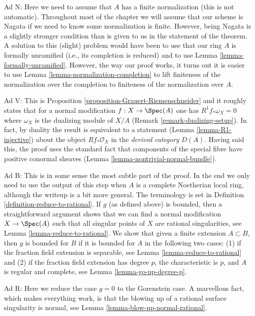 \medskip\noindent
Ad N: Here we need to assume that $A$ has a finite normalization
(this is not automatic). Throughout most of the chapter we will
assume that our scheme is Nagata if we need to know some normalization
is finite. However, being Nagata is a slightly stronger condition
than is given to us in the statement of the theorem.
A solution to this (slight) problem would have been to use that
our ring $A$ is formally unramified (i.e., its completion
is reduced) and to use Lemma \ref{lemma-formally-unramified}.
However, the way our proof works, it turns out it is easier to
use Lemma \ref{lemma-normalization-completion}
to lift finiteness of the normalization over the
completion to finiteness of the normalization over $A$.

\medskip\noindent
Ad V: This is Proposition \ref{proposition-Grauert-Riemenschneider}
and it roughly states that for a normal modification $f : X \to \Spec(A)$
one has $R^1f_*\omega_X = 0$ where $\omega_X$ is the dualizing module
of $X/A$ (Remark \ref{remark-dualizing-setup}).
In fact, by duality the result is equivalent to a statement
(Lemma \ref{lemma-R1-injective})
about the object $Rf_*\mathcal{O}_X$ in the {\it derived category} $D(A)$.
Having said this, the proof uses the standard fact that
components of the special fibre have positive conormal
sheaves (Lemma \ref{lemma-nontrivial-normal-bundle}).

\medskip\noindent
Ad B: This is in some sense the most subtle part of the proof.
In the end we only need to use the output of this step when $A$
is a complete Noetherian local ring, although the writeup is a
bit more general. The terminology is set in
Definition \ref{definition-reduce-to-rational}.
If $g$ (as defined above) is bounded, then a straightforward
argument shows that we can find a normal modification $X \to \Spec(A)$
such that all singular points of $X$ are rational singularities, see
Lemma \ref{lemma-reduce-to-rational}. We show that given a finite extension
$A \subset B$, then $g$ is bounded for $B$ if it is bounded for $A$
in the following two cases: (1) if the fraction field extension
is separable, see Lemma \ref{lemma-reduce-to-rational} and
(2) if the fraction field extension has degree $p$,
the characteristic is $p$, and $A$ is regular and complete, see
Lemma \ref{lemma-go-up-degree-p}.

\medskip\noindent
Ad R: Here we reduce the case $g = 0$ to the Gorenstein case.
A marvellous fact, which makes everything work, is that the
blowing up of a rational surface singularity is normal, see
Lemma \ref{lemma-blow-up-normal-rational}.

